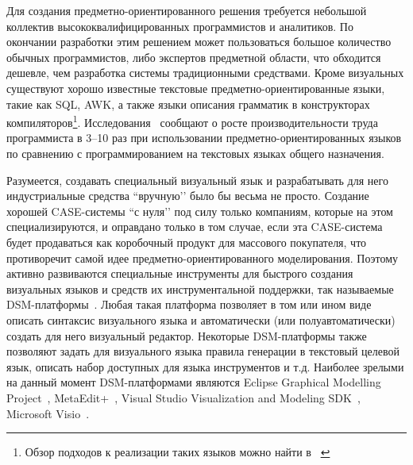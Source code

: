 \documentclass[a4paper]{article}
\begin{document}
Для создания предметно-ориентированного решения  требуется небольшой коллектив высококвалифицированных программистов и аналитиков. По окончании разработки этим решением может пользоваться большое количество обычных программистов, либо экспертов предметной области, что обходится дешевле, чем разработка системы традиционными средствами. Кроме визуальных существуют хорошо известные текстовые предметно-ориентированные языки, такие как SQL, AWK, а также языки описания грамматик в конструкторах компиляторов\footnote{Обзор подходов к реализации таких языков можно найти в ~\cite{dsl}}. Исследования~\cite{kelly, kieburtz, weiss} сообщают о росте производительности труда программиста в 3--10 раз при использовании предметно-ориентированных языков по сравнению с программированием на текстовых языках общего назначения.

Разумеется, создавать специальный визуальный язык и разрабатывать для него индустриальные средства ``вручную’’ было бы весьма не просто. Создание хорошей CASE-системы ``с нуля’’ под силу только компаниям, которые на этом специализируются, и оправдано только в том случае, если эта CASE-система будет продаваться как коробочный продукт для массового покупателя, что противоречит самой идее предметно-ориентированного моделирования. Поэтому активно развиваются специальные инструменты для быстрого создания визуальных языков и средств их инструментальной поддержки, так называемые DSM-платформы~\cite{dsmPlatforms}. Любая такая платформа позволяет в том или ином виде описать синтаксис визуального языка и автоматически (или полуавтоматически) создать для него визуальный редактор. Некоторые DSM-платформы также позволяют задать для визуального языка правила генерации в текстовый целевой язык, описать набор доступных для языка инструментов и т.д. Наиболее зрелыми на данный момент DSM-платформами являются Eclipse Graphical Modelling Project~\cite{gmp, SorKoz}, MetaEdit+~\cite{metaEditPlus}, Visual Studio Visualization and Modeling SDK~\cite{vsvmsdk}, Microsoft Visio~\cite{visio}. 
\end{document}
